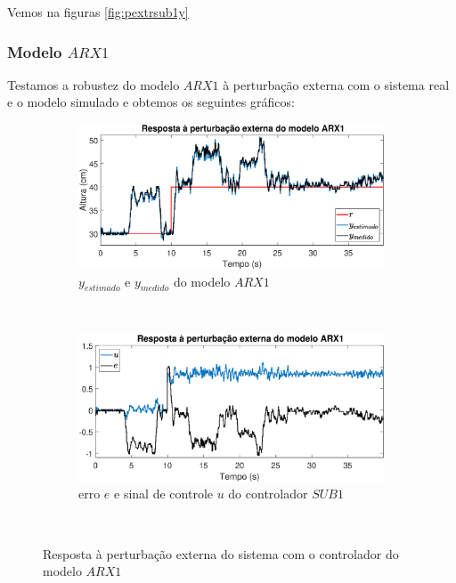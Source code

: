 Vemos na figuras \ref{fig:pextrsub1y}

\subsubsection{Modelo $ARX1$}
Testamos a robustez do modelo $ARX1$ à perturbação externa com o sistema real e o modelo simulado e obtemos os seguintes gráficos:
\begin{figure}[htb]
	\centering
	\begin{subfigure}[t]{0.48\textwidth}
		\includegraphics[width=1\linewidth]{pextrarx1y}
		\caption[$y_{estimado}$ e $y_{medido}$ do modelo $ARX1$]{$y_{estimado}$ e $y_{medido}$ do modelo $ARX1$}
		\label{fig:pextrarx1y}
	\end{subfigure}
	~ %
	\begin{subfigure}[t]{0.48\textwidth}
		\includegraphics[width=1\linewidth]{pextrarx1e}
		\caption[erro $e$ e sinal de controle $u$ do controlador $SUB1$]{erro $e$ e sinal de controle $u$ do controlador $SUB1$}
		\label{fig:pextrarx1e}
	\end{subfigure}
	~ %
	
	\caption{Resposta à perturbação externa do sistema com o controlador do modelo $ARX1$}\label{fig:pextrarx1}
\end{figure}


